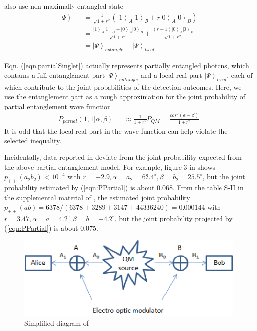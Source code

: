 \documentclass[prd,showpacs,twocolumn]{revtex4-1}
\begin{document}
\cite{Giustina, Shalm} also use non maximally entangled state
\begin{eqnarray}
\left| \Psi\right >&&=\frac{1}{\sqrt{1+r^2}}(\left| 1\right>_A\left| 1\right>_B+r\left| 0\right>_A\left| 0\right>_B)\nonumber\\
&&=\frac{\left| 1\right>_A\left| 1\right>_B+\left| 0\right>_A\left| 0\right>_B}{\sqrt{1+r^2}}+\frac{(r-1)\left| 0\right>_A\left| 0\right>_B}{\sqrt{1+r^2}}\nonumber\\
&&=\left| \Psi\right >_{entangle}+\left| \Psi\right >_{local}
\label{eqn:partialSinglet}
\end{eqnarray}

Eqn. (\ref{eqn:partialSinglet}) actually represents partially entangled photons, which contains a full entanglement part $\left| \Psi\right >_{entangle}$ and a local real part $\left| \Psi\right >_{local}$, each of which contribute to the joint probabilities of the detection outcomes. Here, we use the entanglement part as a rough approximation for the joint probability of partial entanglement wave function
\begin{eqnarray}
P_{partial}(1,1|\alpha,\beta)&&\approx\frac{1}{1+r^2}P_{QM}=\frac{cos^2(\alpha-\beta)}{1+r^2}
\label{eqn:PPartial}
\end{eqnarray}
It is odd that the local real part in the wave function can help violate the selected inequality.

Incidentally, data reported in \cite{Giustina, Shalm} deviate from the joint probability expected from the above partial entanglement model. For example, figure 3 in \cite{Giustina} shows $p_{++}(a_2b_2)<10^{-4}$ with $r=-2.9, \alpha=a_2=62.4^\circ,\beta= b_2=25.5^\circ$, but the joint probability estimated by (\ref{eqn:PPartial}) is about 0.068. From the table S-II in the supplemental material of \cite{Shalm}, the estimated joint probability $p_{++}(ab)=6378/(6378+3289+3147+44336240) = 0.000144$ with $r=3.47, \alpha=a=4.2^\circ, \beta=b=-4.2^\circ$, but the joint probability projected by (\ref{eqn:PPartial}) is about 0.075.

\begin{figure}
\includegraphics[scale=0.7]{redraw-png.eps}
\caption{Simplified diagram of \cite{Weihs}}
\label{fig:Redraw}
\end{figure}
\end{document}
